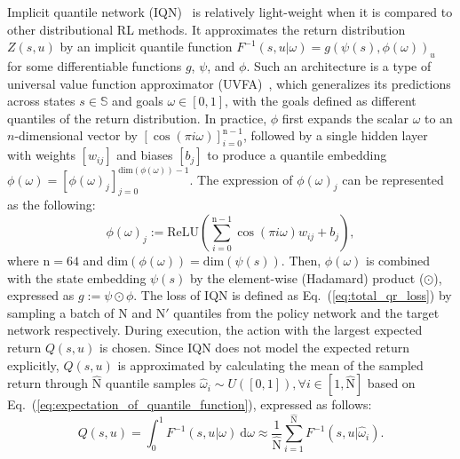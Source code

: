 \documentclass{article}
\newcommand{\statespace}{\mathbb{S}}
\newcommand{\state}{s}
\newcommand{\action}{u}
\newcommand{\utilityexp}{Q}
\newcommand{\utility}{Z}
\newcommand{\quantilefunction}{F^{-1}}
\newcommand{\quantile}{\omega}
\newcommand{\numberofquantiles}{\mathrm{N}}
\newcommand{\numberofquantilesamples}{\mathrm{N}'}
\newcommand{\numberofquantiletestsamples}{\hat{\mathrm{N}}}
\newcommand{\implicitquantilefunction}{g}
\newcommand{\stateembeddingfunction}{\psi}
\newcommand{\cosineembeddingfunction}{\phi}
\newcommand{\cosinedimension}{\mathrm{n}}
\begin{document}
Implicit quantile network (IQN)~\cite{Dabney2018IQN} is relatively light-weight when it is compared to other distributional RL methods. It approximates the return distribution $\utility{}(\state{},\action{})$ by an implicit quantile function $\quantilefunction{}(\state{},\action{}\vert\quantile{})=\implicitquantilefunction{}(\stateembeddingfunction{}(\state{}),\cosineembeddingfunction{}(\quantile{}))_\action{}$ for some differentiable functions $\implicitquantilefunction{}$, $\psi$, and $\phi$. Such an architecture is a type of universal value function approximator (UVFA)~\cite{Schaul2015UVFA}, which generalizes its predictions across states $\state{}\in\statespace{}$ and goals $\quantile{}\in [0,1]$, with the goals defined as different quantiles of the return distribution.
In practice, $\cosineembeddingfunction{}$ first expands the scalar $\quantile$ to an $n$-dimensional vector by $[\cos(\pi i\quantile)]^{\cosinedimension{}-1}_{i=0}$, followed by a single hidden layer with weights $[w_{ij}]$ and biases $[b_j]$ to produce a quantile embedding $\cosineembeddingfunction{}(\quantile{})=[\cosineembeddingfunction(\quantile{})_j]^{\text{dim}(\cosineembeddingfunction{}(\quantile{}))-1}_{j=0}$. The expression of $\cosineembeddingfunction(\quantile{})_j$ can be represented as the following:
\begin{equation}
\cosineembeddingfunction(\quantile{})_j:=\text{ReLU}(\sum_{i=0}^{\cosinedimension{}-1}\cos(\pi i\quantile)w_{ij}+b_j),
\end{equation}
where $\cosinedimension{}=64$ and $\text{dim}(\cosineembeddingfunction(\quantile{}))=\text{dim}(\stateembeddingfunction(\state{}))$. Then, $\cosineembeddingfunction{}(\quantile{})$ is combined with the state embedding $\stateembeddingfunction{}(\state{})$ by the element-wise (Hadamard) product ($\odot$), expressed as $\implicitquantilefunction:=\stateembeddingfunction{}\odot\cosineembeddingfunction{}$. The loss of IQN is defined as Eq.~(\ref{eq:total_qr_loss}) by sampling a batch of $\numberofquantiles{}$ and $\numberofquantilesamples{}$ quantiles from the policy network and the target network respectively.
During execution, the action with the largest expected return $\utilityexp{}(\state{},\action{})$ is chosen. Since IQN does not model the expected return explicitly, $\utilityexp{}(\state{},\action{})$ is approximated by calculating the mean of the sampled return through $\numberofquantiletestsamples{}$ quantile samples $\hat\quantile{}_i\sim U([0,1]), \forall i\in[1,\numberofquantiletestsamples{}]$ based on Eq.~(\ref{eq:expectation_of_quantile_function}), expressed as follows:
\begin{equation}
\utilityexp{}(\state{},\action{})=\int_0^1\quantilefunction{}(\state{},\action{}\vert\quantile{})\ \mathrm{d}\quantile\approx\frac{1}{\numberofquantiletestsamples{}}\sum_{i=1}^{\numberofquantiletestsamples{}}\quantilefunction{}(\state{},\action{}\vert\hat\quantile{}_i).
\end{equation}
\end{document}
